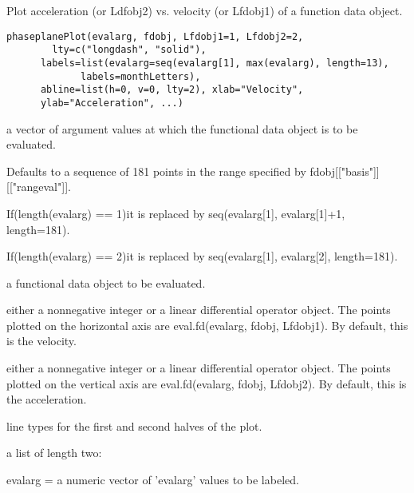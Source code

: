 \begin{Description}\relax
Plot acceleration (or Ldfobj2) vs. velocity (or Lfdobj1) of a function
data object.
\end{Description}
\begin{Usage}
\begin{verbatim}
phaseplanePlot(evalarg, fdobj, Lfdobj1=1, Lfdobj2=2,
        lty=c("longdash", "solid"),  
      labels=list(evalarg=seq(evalarg[1], max(evalarg), length=13),
             labels=monthLetters),
      abline=list(h=0, v=0, lty=2), xlab="Velocity",
      ylab="Acceleration", ...)
\end{verbatim}
\end{Usage}
\begin{Arguments}
\begin{ldescription}
\item[\code{evalarg}] a vector of argument values at which the functional data object is
to be evaluated.

Defaults to a sequence of 181 points in the range
specified by fdobj[["basis"]][["rangeval"]].      

If(length(evalarg) == 1)it is replaced by seq(evalarg[1],
evalarg[1]+1, length=181).  

If(length(evalarg) == 2)it is replaced by seq(evalarg[1],
evalarg[2], length=181).      

\item[\code{fdobj}] a functional data object to be evaluated.

\item[\code{Lfdobj1}] either a nonnegative integer or a linear differential operator
object.  The points plotted on the horizontal axis are
eval.fd(evalarg, fdobj, Lfdobj1).  By default, this is the
velocity.  

\item[\code{Lfdobj2}] either a nonnegative integer or a linear differential operator
object.  The points plotted on the vertical axis are
eval.fd(evalarg, fdobj, Lfdobj2).  By default, this is the
acceleration.  

\item[\code{lty}] line types for the first and second halves of the plot.  

\item[\code{labels}] a list of length two:

evalarg = a numeric vector of 'evalarg' values to be labeled.


\end{ldescription}
\end{Arguments}
